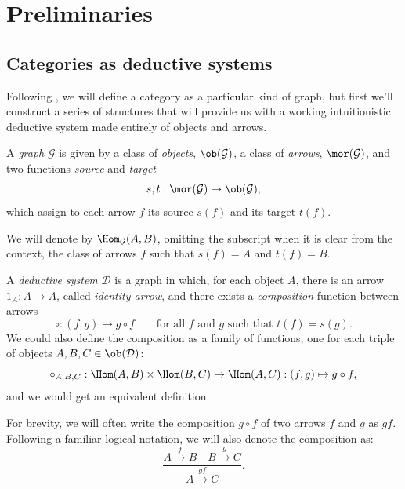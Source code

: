 \chapter{Preliminaries}
\section{Categories as deductive systems}
Following \cite{LambekScott1994}, we will define a category as a particular kind of graph, but first we'll construct a series of structures that will provide us
with a working intuitionistic deductive system made entirely of objects and arrows.

\begin{definition}[Graph]
    A \textit{graph} $\mathcal G$ is given by a class of \textit{objects}, $\ob(\mathcal G)$, a class of \textit{arrows}, $\mor(\mathcal G)$, and two functions
    \textit{source} and \textit{target}
    \[ s,t:\mor(\mathcal G)\to\ob(\mathcal G),\]
    which assign to each arrow $f$ its source $s(f)$ and its target $t(f)$.
\end{definition}

\begin{notation}
    We will denote by $\Hom_{\mathcal G}(A,B)$, omitting the subscript when it is clear from the context, the class of arrows $f$ such that $s(f)=A$ and $t(f)=B$.
\end{notation}

\begin{definition}
    A \textit{deductive system} $\mathcal D$ is a graph in which, for each object $A$, there is an arrow $1_A : A \to A$, called \textit{identity arrow}, and there exists a
    \textit{composition} function between arrows
    \[ \circ : (f,g) \mapsto g \circ f \qquad \text{for all $f$ and $g$ such that $t(f)=s(g)$.} \]
    We could also define the composition as a family of functions, one for each triple of objects $A,B,C \in \ob(\mathcal D)$:
    \[ \circ_{A,B,C} : \Hom(A,B) \times \Hom(B,C) \to \Hom(A,C) : (f,g) \mapsto g \circ f, \]
    and we would get an equivalent definition.
\end{definition}

\begin{notation}
    For brevity, we will often write the composition $g\circ f$ of two arrows $f$ and $g$ as $gf$. Following a familiar logical notation, we will also denote the composition as:
    \[ \frac{A \xrightarrow{f} B \quad B \xrightarrow{g} C}{A \xrightarrow{gf} C}. \]
\end{notation}

